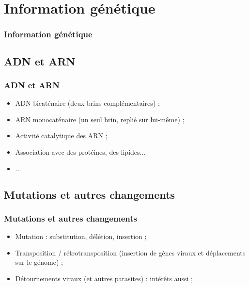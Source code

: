 \documentclass{beamer}
\begin{document}

\section{Information g{\'e}n{\'e}tique }
\begin{frame}
	\frametitle{Information g{\'e}n{\'e}tique }
	\tableofcontents[sections=4,currentsection,subsectionstyle=show/shaded/hide]
\end{frame} 

\subsection{ ADN et ARN }
\begin{frame}
	\frametitle{ ADN et ARN }
	\begin{itemize}
		\item ADN bicat{\'e}naire (deux brins compl{\'e}mentaires) ; 
		\item ARN monocat{\'e}naire (un seul brin, repli{\'e} sur lui-m{\^e}me) ; 
		\item Activit{\'e} catalytique des ARN ; 
		\item Association avec des prot{\'e}ines, des lipides... 
		\item ... 
	\end{itemize}
\end{frame}

\subsection{ Mutations et autres changements }
\begin{frame}
	\frametitle{ Mutations et autres changements }
	\begin{itemize}
		\item Mutation : substitution, d{\'e}l{\'e}tion, insertion ; 
		\item Transposition / r{\'e}trotransposition (insertion de g{\`e}nes viraux et d{\'e}placements sur le g{\'e}nome) ; 
		\item D{\'e}tournements viraux (et autres parasites) : int{\'e}r{\^e}ts aussi ; 
	\end{itemize}
\end{frame}
\end{document}
